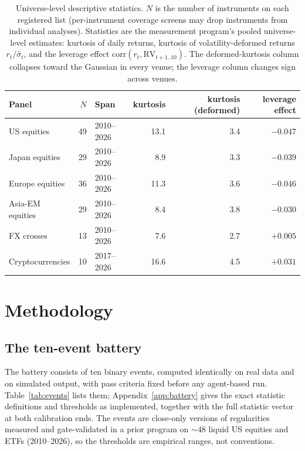 \documentclass[11pt]{article}
\begin{document}
\begin{table}[t]
\centering\small
\begin{tabular}{lrlrrr}
\toprule
Panel & $N$ & Span & kurtosis & kurtosis (deformed) & leverage effect \\
\midrule
US equities        & 49 & 2010--2026 & 13.1 & 3.4 & $-0.047$ \\
Japan equities     & 29 & 2010--2026 & 8.9  & 3.3 & $-0.039$ \\
Europe equities    & 36 & 2010--2026 & 11.3 & 3.6 & $-0.046$ \\
Asia-EM equities   & 29 & 2010--2026 & 8.4  & 3.8 & $-0.030$ \\
FX crosses         & 13 & 2010--2026 & 7.6  & 2.7 & $+0.005$ \\
Cryptocurrencies   & 10 & 2017--2026 & 16.6 & 4.5 & $+0.031$ \\
\bottomrule
\end{tabular}
\caption{Universe-level descriptive statistics. $N$ is the number of
instruments on each registered list (per-instrument coverage screens may
drop instruments from individual analyses). Statistics are the measurement
program's pooled universe-level estimates: kurtosis of daily returns,
kurtosis of volatility-deformed returns $r_t/\hat\sigma_t$, and the
leverage effect $\mathrm{corr}(r_t, \mathrm{RV}_{t+1..10})$. The
deformed-kurtosis column collapses toward the Gaussian in every venue; the
leverage column changes sign across venues.}
\label{tab:data}
\end{table}

\section{Methodology}
\label{sec:methods}

\subsection{The ten-event battery}
\label{sec:battery}

The battery consists of ten binary events, computed identically on real data
and on simulated output, with pass criteria fixed before any agent-based run.
Table~\ref{tab:events} lists them; Appendix~\ref{app:battery} gives the exact
statistic definitions and thresholds as implemented, together with the full
statistic vector at both calibration ends. The events are close-only versions
of regularities measured and gate-validated in a prior program on $\sim$48
liquid US equities and ETFs (2010--2026), so the thresholds are empirical
ranges, not conventions.
\end{document}
